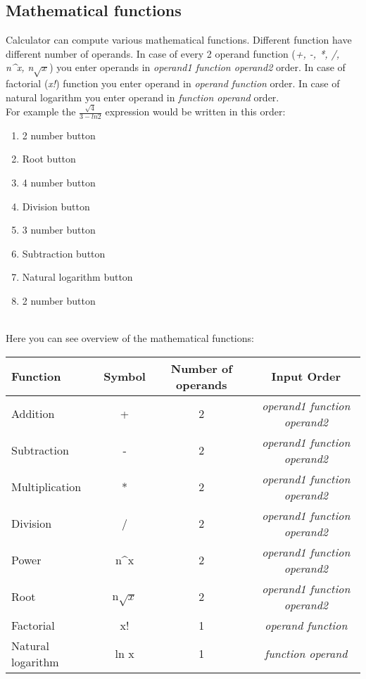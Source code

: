 \documentclass{article}
\begin{document}
\subsection{Mathematical functions}
\label{mf}
Calculator can compute various mathematical functions. Different function have different number of operands. In case of every 2 operand function (\emph{+, -, *, /, n\^{}x, n$\sqrt{x}$}) you enter operands in \emph{operand1 function operand2} order. In case of factorial (\emph{x!}) function you enter operand in \emph{operand function} order. In case of natural logarithm you enter operand in \emph{function operand} order.
\\For example the $\frac{\sqrt{4}}{3-ln2}$ expression would be written in this order:
\begin{enumerate}
\item 2 number button
\item Root button
\item 4 number button
\item Division button
\item 3 number button
\item Subtraction button
\item Natural logarithm button
\item 2 number button
\end{enumerate}
\\
Here you can see overview of the mathematical functions:
\begin{center}
\begin{tabular}{| l | c | c | c |}
\hline
Function & Symbol & Number of operands & Input Order\\\hline\hline
Addition & + & 2 & \emph{operand1 function operand2}\\\hline
Subtraction & - & 2 & \emph{operand1 function operand2}\\\hline
Multiplication & * & 2 & \emph{operand1 function operand2}\\\hline
Division & / & 2 & \emph{operand1 function operand2}\\\hline
Power & n\^{}x & 2 & \emph{operand1 function operand2}\\\hline
Root & n$\sqrt{x}$  & 2 & \emph{operand1 function operand2}\\\hline
Factorial & x! & 1 & \emph{operand function}\\\hline
Natural logarithm & ln x & 1 & \emph{function operand}\\\hline
\end{tabular}
\end{center}
\end{document}
